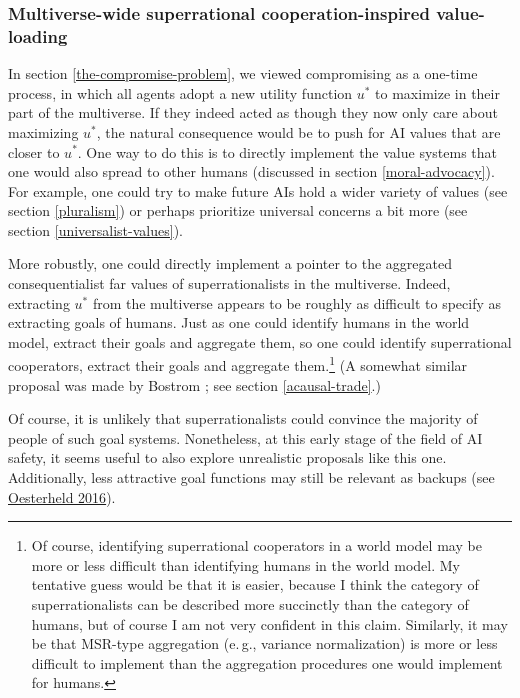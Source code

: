 \subsubsection{Multiverse-wide superrational cooperation-inspired
value-loading}\label{multiverse-wide-superrational-cooperation-inspired-value-loading}

In section \ref{the-compromise-problem}, we viewed compromising as a one-time process, in
which all agents adopt a new utility function \(u^{*}\) to maximize in
their part of the multiverse. If they indeed acted as though they now
only care about maximizing \(u^{*}\), the natural consequence would be
to push for AI values that are closer to \(u^{*}\). One way to do this
is to directly implement the value systems that one would also spread to
other humans (discussed in section
\ref{moral-advocacy}). For
example, one could try to make future AIs hold a wider variety of values
(see section \ref{pluralism}) or
perhaps prioritize universal concerns a bit more (see section
\ref{universalist-values}).

More robustly, one could directly implement a pointer to the aggregated
consequentialist far values of superrationalists in the multiverse.
Indeed, extracting \(u^{*}\) from the multiverse appears to be roughly
as difficult to specify as extracting goals of humans. Just as one could
identify humans in the world model, extract their goals and aggregate
them, so one could identify superrational cooperators, extract their
goals and aggregate them.\footnote{Of course, identifying superrational
  cooperators in a world model may be more or less difficult than
  identifying humans in the world model. My tentative guess would be
  that it is easier, because I think the category of superrationalists
  can be described more succinctly than the category of humans, but of
  course I am not very confident in this claim. Similarly, it may be
  that MSR-type aggregation (e.\,g., variance normalization) is more or
  less difficult to implement than the aggregation procedures one would
  implement for humans.} (A somewhat similar proposal was made by Bostrom
\citeyear{Bostrom2014-gy}; see section
\ref{acausal-trade}.)

Of course, it is unlikely that superrationalists could convince the
majority of people of such goal systems. Nonetheless, at this early
stage of the field of AI safety, it seems useful to also explore
unrealistic proposals like this one. Additionally, less attractive goal
functions may still be relevant as backups (see
\href{https://foundational-research.org/files/backup-utility-functions.pdf}{Oesterheld
2016}).

